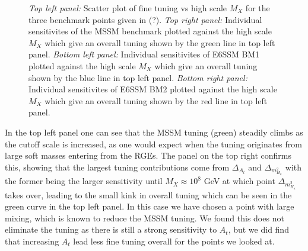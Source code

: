 \documentclass[preprint,amsmath,amssymb,aps,superscriptaddress,prd,showpacs,floatfix,nofootinbib]{revtex4-1}
\begin{document}
\begin{figure}
\begin{center}
\caption{{\it Top left panel:} Scatter plot of fine tuning vs high scale $M_X$ for the three benchmark points given in (?).  {\it Top right panel:}  Individual sensitivites of the MSSM benchmark plotted against the high scale $M_X$ which give an overall tuning shown by the green line in top left panel.  {\it Bottom left panel:} Individual sensitivites of E6SSM BM1 plotted against the high scale $M_X$ which give an overall tuning shown by the blue line in top left panel.  {\it Bottom right panel:} Individual sensitivites of E6SSM BM2 plotted against the high scale $M_X$ which give an overall tuning shown by the red line in top left panel.    }
\label{Fig:BMs-varyMX}
\end{center}
\end{figure}

In the top left panel one can see that the MSSM tuning (green)
steadily climbs as the cutoff scale is increased, as one would expect
when the tuning originates from large soft masses entering from the
RGEs. The panel on the top right confirms this, showing that the
largest tuning contributions come from $\Delta_{A_t}$ and
$\Delta_{m_{H_u}^2}$ with the former being the larger sensitivity
until $M_X\approx 10^8$ GeV at which point $\Delta_{m_{H_u}^2}$ takes
over, leading to the small kink in overall tuning which can be seen in
the green curve in the top left panel. In this case we have chosen a
point with large mixing, which is known to reduce the MSSM tuning.  We
found this does not eliminate the tuning as there is still a strong
sensitivity to $A_t$, but we did find that increasing $A_t$ lead less
fine tuning overall for the points we looked at.
\end{document}

